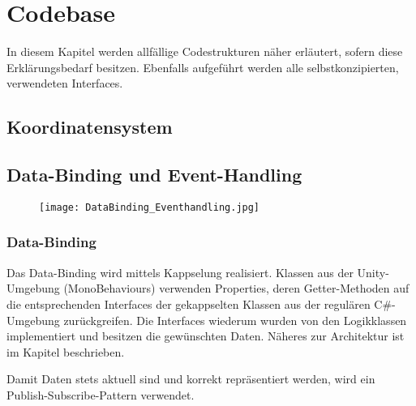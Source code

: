 \documentclass[../main.tex]{subfiles}
\begin{document}

	\section{Codebase}
	\par In diesem Kapitel werden allfällige Codestrukturen näher erläutert, sofern diese Erklärungsbedarf besitzen. Ebenfalls aufgeführt werden alle selbstkonzipierten, verwendeten Interfaces.
	
	\subsection{Koordinatensystem}
	
	\subsection{Data-Binding und Event-Handling}
	\begin{figure}[H]
		\centering
		\texttt{[image: DataBinding\_Eventhandling.jpg]}
	\end{figure}
	\subsubsection{Data-Binding}
	\par Das Data-Binding wird mittels Kappselung realisiert. Klassen aus der Unity-Umgebung (MonoBehaviours) verwenden Properties, deren Getter-Methoden auf die entsprechenden Interfaces der gekappselten Klassen aus der regulären C\#-Umgebung zurückgreifen. Die Interfaces wiederum wurden von den Logikklassen implementiert und besitzen die gewünschten Daten. Näheres zur Architektur ist im Kapitel  beschrieben.
	\par Damit Daten stets aktuell sind und korrekt repräsentiert werden, wird ein Publish-Subscribe-Pattern verwendet.
	
\end{document}
